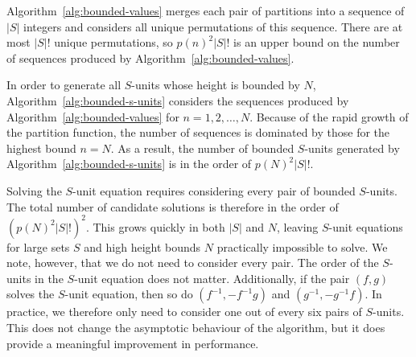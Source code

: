 Algorithm~\ref{alg:bounded-values} merges each pair of partitions into a sequence of \(|S|\) integers and considers all unique permutations of this sequence. There are at most \(|S|!{}\) unique permutations, so \({p(n)}^{2}|S|!{}\) is an upper bound on the number of sequences produced by Algorithm~\ref{alg:bounded-values}.

In order to generate all \(S\)-units whose height is bounded by \(N\), Algorithm~\ref{alg:bounded-s-units} considers the sequences produced by Algorithm~\ref{alg:bounded-values} for \(n = 1, 2, \dots, N\). Because of the rapid growth of the partition function, the number of sequences is dominated by those for the highest bound \(n = N\). As a result, the number of bounded \(S\)-units generated by Algorithm~\ref{alg:bounded-s-units} is in the order of \({p(N)}^{2}|S|!{}\).

Solving the \(S\)-unit equation requires considering every pair of bounded \(S\)-units. The total number of candidate solutions is therefore in the order of \({({p(N)}^{2}|S|!{})}^{2}\). This grows quickly in both \(|S|\) and \(N\), leaving \(S\)-unit equations for large sets \(S\) and high height bounds \(N\) practically impossible to solve. We note, however, that we do not need to consider every pair. The order of the \(S\)-units in the \(S\)-unit equation does not matter. Additionally, if the pair \((f, g)\) solves the \(S\)-unit equation, then so do \((f^{-1}, - f^{-1}g)\) and \((g^{-1}, - g^{-1}f)\). In practice, we therefore only need to consider one out of every six pairs of \(S\)-units. This does not change the asymptotic behaviour of the algorithm, but it does provide a meaningful improvement in performance.
